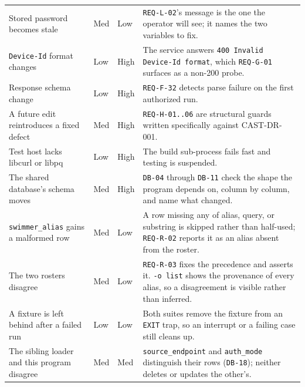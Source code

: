 \documentclass[12pt]{article}
\newcommand{\code}[1]{\texttt{#1}}
\newcommand{\req}[1]{\texttt{#1}}
\begin{document}
\begin{center}
\begin{longtable}{p{4.0cm}p{1.5cm}p{1.5cm}p{6cm}}
  Stored password becomes stale
      & Med  & Low  & \req{REQ-L-02}'s message is the one the operator
                      will see; it names the two variables to fix. \\
  \code{Device-Id} format changes
      & Low  & High & The service answers \code{400 Invalid Device-Id
                      format}, which \req{REQ-G-01} surfaces as a
                      non-200 probe. \\
  Response schema change
      & Low  & High & \req{REQ-F-32} detects parse failure on the
                      first authorized run. \\
  A future edit reintroduces a fixed defect
      & Med  & High & \req{REQ-H-01..06} are structural guards written
                      specifically against CAST-DR-001. \\
  Test host lacks libcurl or libpq
      & Low  & High & The build sub-process fails fast and testing is
                      suspended. \\
  The shared database's schema moves
      & Med  & High & \req{DB-04} through \req{DB-11} check the shape
                      the program depends on, column by column, and
                      name what changed. \\
  \code{swimmer\_alias} gains a malformed row
      & Med  & Low  & A row missing any of alias, query, or substring is
                      skipped rather than half-used; \req{REQ-R-02}
                      reports it as an alias absent from the roster. \\
  The two rosters disagree
      & Med  & Low  & \req{REQ-R-03} fixes the precedence and asserts
                      it.  \code{-o list} shows the provenance of every
                      alias, so a disagreement is visible rather than
                      inferred. \\
  A fixture is left behind after a failed run
      & Low  & Low  & Both suites remove the fixture from an
                      \code{EXIT} trap, so an interrupt or a failing
                      case still cleans up. \\
  The sibling loader and this program disagree
      & Med  & Med  & \code{source\_endpoint} and \code{auth\_mode}
                      distinguish their rows (\req{DB-18}); neither
                      deletes or updates the other's. \\
  \bottomrule
\end{longtable}
\end{center}
\end{document}
